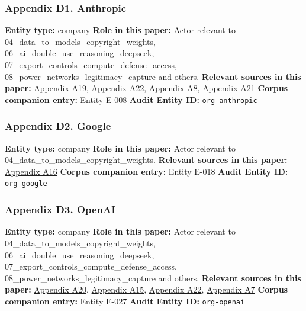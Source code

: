 \documentclass[
  american,
  11pt,
  letterpaper,
]{article}
\begin{document}
\subsubsection{Appendix D1. Anthropic}\label{appendix-d1-anthropic}

\textbf{Entity type:} company \textbf{Role in this paper:} Actor
relevant to 04\_data\_to\_models\_copyright\_weights,
06\_ai\_double\_use\_reasoning\_deepseek,
07\_export\_controls\_compute\_defense\_access,
08\_power\_networks\_legitimacy\_capture and others. \textbf{Relevant
sources in this paper:}
\hyperref[appendix-a19-bartz-et-al-v-anthropic-pbc-order-on-fair-use]{Appendix
A19},
\hyperref[appendix-a22-anthropic-outspends-openai-in-biggest-ever-lobbying-quarter]{Appendix
A22},
\hyperref[appendix-a8-claude-gov-models-for-u-s-national-security-customers]{Appendix
A8},
\hyperref[appendix-a21-anthropic-and-palantir-partner-to-bring-claude-ai-models-to-aws-for-u-s-government-intelligence-and-defense-operations]{Appendix
A21} \textbf{Corpus companion entry:} Entity E-008 \textbf{Audit Entity
ID:} \texttt{org-anthropic}

\subsubsection{Appendix D2. Google}\label{appendix-d2-google}

\textbf{Entity type:} company \textbf{Role in this paper:} Actor
relevant to 04\_data\_to\_models\_copyright\_weights. \textbf{Relevant
sources in this paper:}
\hyperref[appendix-a16-reddit-strikes-60m-deal-allowing-google-to-train-ai-models-on-its-posts-unveils-ipo-plans]{Appendix
A16} \textbf{Corpus companion entry:} Entity E-018 \textbf{Audit Entity
ID:} \texttt{org-google}

\subsubsection{Appendix D3. OpenAI}\label{appendix-d3-openai}

\textbf{Entity type:} company \textbf{Role in this paper:} Actor
relevant to 04\_data\_to\_models\_copyright\_weights,
06\_ai\_double\_use\_reasoning\_deepseek,
07\_export\_controls\_compute\_defense\_access,
08\_power\_networks\_legitimacy\_capture and others. \textbf{Relevant
sources in this paper:}
\hyperref[appendix-a20-openais-proposals-for-the-us-ai-action-plan]{Appendix
A20},
\hyperref[appendix-a15-language-models-are-unsupervised-multitask-learners]{Appendix
A15},
\hyperref[appendix-a22-anthropic-outspends-openai-in-biggest-ever-lobbying-quarter]{Appendix
A22}, \hyperref[appendix-a7-introducing-openai-for-government]{Appendix
A7} \textbf{Corpus companion entry:} Entity E-027 \textbf{Audit Entity
ID:} \texttt{org-openai}
\end{document}
